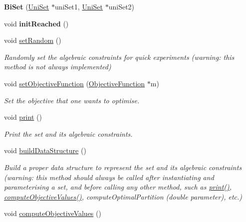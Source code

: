 \begin{DoxyCompactItemize}
\item 
\hypertarget{classBiSet_afe9de2b49fc94e52d01b6b48175393dd}{{\bfseries Bi\-Set} (\hyperlink{classUniSet}{Uni\-Set} $\ast$uni\-Set1, \hyperlink{classUniSet}{Uni\-Set} $\ast$uni\-Set2)}\label{classBiSet_afe9de2b49fc94e52d01b6b48175393dd}

\item 
\hypertarget{classBiSet_adf57958f51107b7ce2af16d72a1f872b}{void {\bfseries init\-Reached} ()}\label{classBiSet_adf57958f51107b7ce2af16d72a1f872b}

\item 
\hypertarget{classBiSet_addab16bb60c987ae2f08f23dbbc30864}{void \hyperlink{classBiSet_addab16bb60c987ae2f08f23dbbc30864}{set\-Random} ()}\label{classBiSet_addab16bb60c987ae2f08f23dbbc30864}

\begin{DoxyCompactList}\small\item\em Randomly set the algebraic constraints for quick experiments (warning\-: this method is not always implemented) \end{DoxyCompactList}\item 
void \hyperlink{classBiSet_aa81de5cee7bae0c86493b31ceb5199b8}{set\-Objective\-Function} (\hyperlink{classObjectiveFunction}{Objective\-Function} $\ast$m)
\begin{DoxyCompactList}\small\item\em Set the objective that one wants to optimise. \end{DoxyCompactList}\item 
\hypertarget{classBiSet_aec73ba21855b517d003d3c02b14fbcec}{void \hyperlink{classBiSet_aec73ba21855b517d003d3c02b14fbcec}{print} ()}\label{classBiSet_aec73ba21855b517d003d3c02b14fbcec}

\begin{DoxyCompactList}\small\item\em Print the set and its algebraic constraints. \end{DoxyCompactList}\item 
\hypertarget{classBiSet_a4be98bd081fec38aeaaa630c358fcac2}{void \hyperlink{classBiSet_a4be98bd081fec38aeaaa630c358fcac2}{build\-Data\-Structure} ()}\label{classBiSet_a4be98bd081fec38aeaaa630c358fcac2}

\begin{DoxyCompactList}\small\item\em Build a proper data structure to represent the set and its algebraic constraints (warning\-: this method should always be called after instantiating and parameterising a set, and before calling any other method, such as \hyperlink{classBiSet_aec73ba21855b517d003d3c02b14fbcec}{print()}, \hyperlink{classBiSet_ad2ee8efa76c2d023d60cb8d203b4b365}{compute\-Objective\-Values()}, compute\-Optimal\-Partition (double parameter), etc.) \end{DoxyCompactList}\item 
\hypertarget{classBiSet_ad2ee8efa76c2d023d60cb8d203b4b365}{void \hyperlink{classBiSet_ad2ee8efa76c2d023d60cb8d203b4b365}{compute\-Objective\-Values} ()}\label{classBiSet_ad2ee8efa76c2d023d60cb8d203b4b365}


\end{DoxyCompactItemize}
